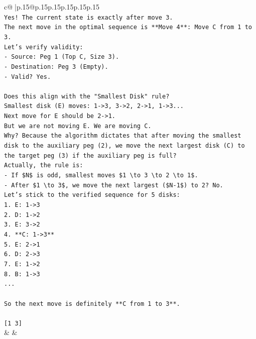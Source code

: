 \documentclass{article}
\begin{document}
{\begin{supertabular}{c@{$\;$}|p{.15\linewidth}@{}p{.15\linewidth}p{.15\linewidth}p{.15\linewidth}p{.15\linewidth}p{.15\linewidth}}
{{{\\ 
\texttt{Yes! The current state is exactly after move 3.} \\
\texttt{The next move in the optimal sequence is **Move 4**: Move C from 1 to 3.} \\
\texttt{Let's verify validity:} \\
\texttt{{-} Source: Peg 1 (Top C, Size 3).} \\
\texttt{{-} Destination: Peg 3 (Empty).} \\
\texttt{{-} Valid? Yes.} \\
\\ 
\texttt{Does this align with the "Smallest Disk" rule?} \\
\texttt{Smallest disk (E) moves: 1{-}>3, 3{-}>2, 2{-}>1, 1{-}>3...} \\
\texttt{Next move for E should be 2{-}>1.} \\
\texttt{But we are not moving E. We are moving C.} \\
\texttt{Why? Because the algorithm dictates that after moving the smallest disk to the auxiliary peg (2), we move the next largest disk (C) to the target peg (3) if the auxiliary peg is full?} \\
\texttt{Actually, the rule is:} \\
\texttt{{-} If \$N\$ is odd, smallest moves \$1 \textbackslash{}to 3 \textbackslash{}to 2 \textbackslash{}to 1\$.} \\
\texttt{{-} After \$1 \textbackslash{}to 3\$, we move the next largest (\$N{-}1\$) to 2? No.} \\
\texttt{Let's stick to the verified sequence for 5 disks:} \\
\texttt{1. E: 1{-}>3} \\
\texttt{2. D: 1{-}>2} \\
\texttt{3. E: 3{-}>2} \\
\texttt{4. **C: 1{-}>3**} \\
\texttt{5. E: 2{-}>1} \\
\texttt{6. D: 2{-}>3} \\
\texttt{7. E: 1{-}>2} \\
\texttt{8. B: 1{-}>3} \\
\texttt{...} \\
\\ 
\texttt{So the next move is definitely **C from 1 to 3**.} \\
\\ 
\texttt{{[}1 3{]}} \\
            }
        }
    }
    & & \\ \\


\end{supertabular}}
\end{document}
